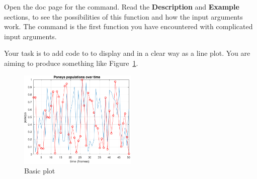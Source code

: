\documentclass{article}
\begin{document}
Open the doc page for the  command.
Read the \textbf{Description} and \textbf{Example} sections, to see the possibilities of this function and how the input arguments work.
The  command is the first function you have encountered with complicated input arguments.

Your task is to add code to  to display  and  in a clear way as a line plot.
You are aiming to produce something like Figure~\ref{fig:basic}.
\begin{figure}[h]
  \centering
  \includegraphics[width=0.5\textwidth]{basicplot.pdf}
  \caption{Basic plot}\label{fig:basic}
\end{figure}
\end{document}
